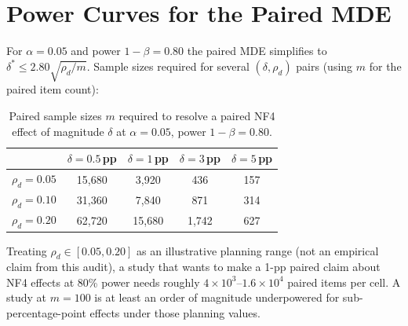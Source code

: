 \documentclass{article}
\begin{document}
\section{Power Curves for the Paired MDE}
\label{sec:power}

For $\alpha{=}0.05$ and power $1-\beta{=}0.80$ the paired MDE simplifies to $\delta^* \le 2.80\sqrt{\rho_d/m}$. Sample sizes required for several $(\delta, \rho_d)$ pairs (using $m$ for the paired item count):

\begin{table}[t]
\caption{Paired sample sizes $m$ required to resolve a paired NF4 effect of magnitude $\delta$ at $\alpha{=}0.05$, power $1-\beta{=}0.80$.}
\label{tab:power}
\centering
\small
\begin{tabular}{lcccc}
\toprule
& $\delta{=}0.5$\,pp & $\delta{=}1$\,pp & $\delta{=}3$\,pp & $\delta{=}5$\,pp \\
\midrule
$\rho_d{=}0.05$ & 15{,}680 & 3{,}920 & 436 & 157 \\
$\rho_d{=}0.10$ & 31{,}360 & 7{,}840 & 871 & 314 \\
$\rho_d{=}0.20$ & 62{,}720 & 15{,}680 & 1{,}742 & 627 \\
\bottomrule
\end{tabular}
\end{table}

Treating $\rho_d \in [0.05, 0.20]$ as an illustrative planning range (not an empirical claim from this audit), a study that wants to make a 1-pp paired claim about NF4 effects at 80\% power needs roughly $4\times 10^3$--$1.6\times10^4$ paired items per cell. A study at $m{=}100$ is at least an order of magnitude underpowered for sub-percentage-point effects under those planning values.
\end{document}
